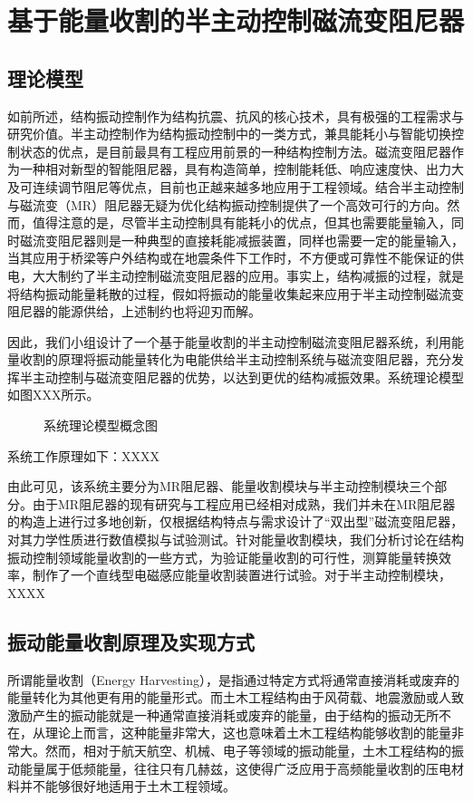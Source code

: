 \section{基于能量收割的半主动控制磁流变阻尼器}
\subsection{理论模型}
如前所述，结构振动控制作为结构抗震、抗风的核心技术，具有极强的工程需求与研究价值。半主动控制作为结构振动控制中的一类方式，兼具能耗小与智能切换控制状态的优点，是目前最具有工程应用前景的一种结构控制方法。磁流变阻尼器作为一种相对新型的智能阻尼器，具有构造简单，控制能耗低、响应速度快、出力大及可连续调节阻尼等优点，目前也正越来越多地应用于工程领域。结合半主动控制与磁流变（MR）阻尼器无疑为优化结构振动控制提供了一个高效可行的方向。然而，值得注意的是，尽管半主动控制具有能耗小的优点，但其也需要能量输入，同时磁流变阻尼器则是一种典型的直接耗能减振装置，同样也需要一定的能量输入，当其应用于桥梁等户外结构或在地震条件下工作时，不方便或可靠性不能保证的供电，大大制约了半主动控制磁流变阻尼器的应用。事实上，结构减振的过程，就是将结构振动能量耗散的过程，假如将振动的能量收集起来应用于半主动控制磁流变阻尼器的能源供给，上述制约也将迎刃而解。

因此，我们小组设计了一个基于能量收割的半主动控制磁流变阻尼器系统，利用能量收割的原理将振动能量转化为电能供给半主动控制系统与磁流变阻尼器，充分发挥半主动控制与磁流变阻尼器的优势，以达到更优的结构减振效果。系统理论模型如图XXX所示。

\begin{figure}[H]
\caption{系统理论模型概念图}
\end{figure}

系统工作原理如下：XXXX

由此可见，该系统主要分为MR阻尼器、能量收割模块与半主动控制模块三个部分。由于MR阻尼器的现有研究与工程应用已经相对成熟，我们并未在MR阻尼器的构造上进行过多地创新，仅根据结构特点与需求设计了“双出型”磁流变阻尼器，对其力学性质进行数值模拟与试验测试。针对能量收割模块，我们分析讨论在结构振动控制领域能量收割的一些方式，为验证能量收割的可行性，测算能量转换效率，制作了一个直线型电磁感应能量收割装置进行试验。对于半主动控制模块，XXXX

\subsection{振动能量收割原理及实现方式}

所谓能量收割（Energy Harvesting），是指通过特定方式将通常直接消耗或废弃的能量转化为其他更有用的能量形式。而土木工程结构由于风荷载、地震激励或人致激励产生的振动能就是一种通常直接消耗或废弃的能量，由于结构的振动无所不在，从理论上而言，这种能量非常大，这也意味着土木工程结构能够收割的能量非常大。然而，相对于航天航空、机械、电子等领域的振动能量，土木工程结构的振动能量属于低频能量，往往只有几赫兹，这使得广泛应用于高频能量收割的压电材料并不能够很好地适用于土木工程领域。

